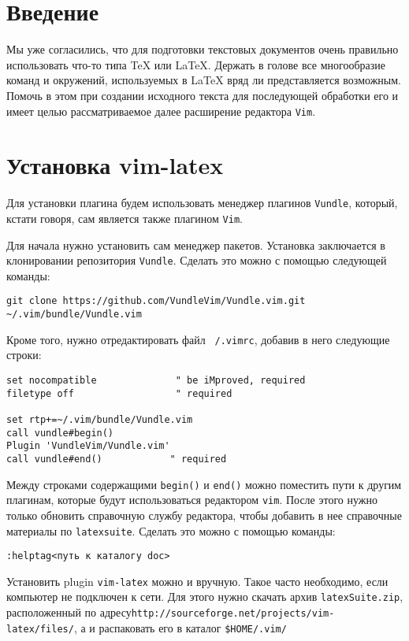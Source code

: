 \documentclass[a4paper]{article}
\begin{document}
\part{Введение}
Мы уже согласились, что для подготовки текстовых документов очень правильно
использовать что-то типа \TeX{} или \LaTeX. Держать в голове все многообразие
команд и окружений, используемых в \LaTeX{} вряд ли представляется возможным.
Помочь в этом при создании исходного текста для последующей обработки его 
 и имеет целью рассматриваемое далее расширение редактора \texttt{Vim}.
\part{Установка vim-latex}
Для установки плагина будем использовать менеджер плагинов \texttt{Vundle}, 
который, кстати говоря, сам является также плагином \texttt{Vim}.

Для начала нужно установить сам менеджер пакетов. Установка заключается в
клонировании репозитория \texttt{Vundle}. Сделать это можно с помощью следующей
команды:
\begin{verbatim}
git clone https://github.com/VundleVim/Vundle.vim.git ~/.vim/bundle/Vundle.vim
\end{verbatim}
Кроме того, нужно отредактировать файл \texttt{~/.vimrc}, добавив в него следующие
строки:
\begin{verbatim}
set nocompatible              " be iMproved, required
filetype off                  " required

set rtp+=~/.vim/bundle/Vundle.vim
call vundle#begin()
Plugin 'VundleVim/Vundle.vim'
call vundle#end()            " required
\end{verbatim}
Между строками содержащими \texttt{begin()} и \texttt{end()} можно поместить 
пути к другим плагинам, которые будут использоваться редактором \texttt{vim}.
После этого нужно только обновить справочную службу редактора, чтобы добавить
в нее справочные материалы по \texttt{latexsuite}. Сделать это можно с помощью
команды: \begin{verbatim}
:helptag<путь к каталогу doc>
\end{verbatim}

Установить plugin \texttt{vim-latex} можно и вручную. Такое часто необходимо, 
если компьютер не подключен к сети. Для этого нужно скачать архив 
\texttt{latexSuite.zip}, расположенный по адресу\linebreak \texttt{http://sourceforge.net/projects/vim-latex/files/},
а и распаковать его в каталог \verb|$HOME/.vim/|
\end{document}
